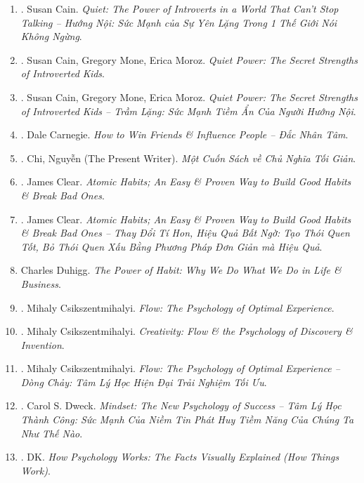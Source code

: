 \documentclass{article}
\begin{document}
\begin{enumerate}
	\item \cite{Cain2022}. Susan Cain. \textit{Quiet: The Power of Introverts in a World That Can't Stop Talking -- Hướng Nội: Sức Mạnh của Sự Yên Lặng Trong 1 Thế Giới Nói Không Ngừng}.\hfill{\sf[done]}
	\item \cite{Cain_Mone_Moroz2017}. Susan Cain, Gregory Mone, Erica Moroz. \textit{Quiet Power: The Secret Strengths of Introverted Kids}.\hfill{\sf[reading]}
	\item \cite{Cain_Mone_Moroz2023}. Susan Cain, Gregory Mone, Erica Moroz. \textit{Quiet Power: The Secret Strengths of Introverted Kids -- Trầm Lặng: Sức Mạnh Tiềm Ẩn Của Người Hướng Nội}.\hfill{\sf[done]}
	\item \cite{Carnegie2021}. Dale Carnegie. \textit{How to Win Friends \& Influence People -- Đắc Nhân Tâm}.\hfill{\sf[done]}
	\item \cite{Chi2022}. Chi, Nguyễn (The Present Writer). \textit{Một Cuốn Sách về Chủ Nghĩa Tối Giản}. \hfill{\sf[done]}
	\item \cite{Clear2018}. James Clear. \textit{Atomic Habits; An Easy \& Proven Way to Build Good Habits \& Break Bad Ones}.\hfill{\sf[reading]}
	\item \cite{Clear2022}. James Clear. \textit{Atomic Habits; An Easy \& Proven Way to Build Good Habits \& Break Bad Ones -- Thay Đổi Tí Hon, Hiệu Quả Bất Ngờ: Tạo Thói Quen Tốt, Bỏ Thói Quen Xấu Bằng Phương Pháp Đơn Giản mà Hiệu Quả}.\hfill{\sf[done]}
	\item Charles Duhigg. \textit{The Power of Habit: Why We Do What We Do in Life \& Business}.
	\item \cite{Csikszentmihalyi2008}. Mihaly Csikszentmihalyi. \textit{Flow: The Psychology of Optimal Experience}.\hfill{\sf[reading]}
	\item \cite{Csikszentmihalyi2013}. Mihaly Csikszentmihalyi. \textit{Creativity: Flow \& the Psychology of Discovery \& Invention}.\hfill{\sf[reading]}
	\item \cite{Csikszentmihalyi2021}. Mihaly Csikszentmihalyi. \textit{Flow: The Psychology of Optimal Experience -- Dòng Chảy: Tâm Lý Học Hiện Đại Trải Nghiệm Tối Ưu}.\hfill{\sf[done]}
	\item \cite{Dweck_mindset}. Carol S. Dweck. \textit{Mindset: The New Psychology of Success -- Tâm Lý Học Thành Công: Sức Mạnh Của Niềm Tin Phát Huy Tiềm Năng Của Chúng Ta Như Thế Nào}.\hfill\hfill{\sf[done]}
	\item \cite{DK2018}. DK. \textit{How Psychology Works: The Facts Visually Explained (How Things Work)}.\hfill{\sf[reading]} 

\end{enumerate}
\end{document}
